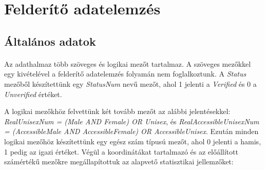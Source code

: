 	\section{Felderítő adatelemzés}
	\subsection{Általános adatok}
	\paragraph{}
	Az adathalmaz több szöveges és logikai mezőt tartalmaz. A szöveges mezőkkel egy kivételével a felderítő adatelemzés folyamán nem foglalkoztunk. A \textit{Status} mezőből készítettünk egy \textit{StatusNum} nevű mezőt, ahol 1 jelenti a \textit{Verified} és 0 a \textit{Unverified} értéket. \par
	A logikai mezőkhöz felvettünk két tovább mezőt az alábbi jelentésekkel: \textit{RealUnisexNum = (Male AND Female) OR Unisex}, és \textit{RealAccessibleUnisexNum = (AccessibleMale AND AccessibleFemale) OR AccessibleUnisex}. Ezután minden logikai mezőhöz készítettünk egy egész szám típusú mezőt, ahol 0 jelenti a hamis, 1 pedig az igazi értéket. Végül a koordinátákat tartalmazó és az előállított számértékű mezőkre megállapítottuk az alapvető statisztikai jellemzőket:

